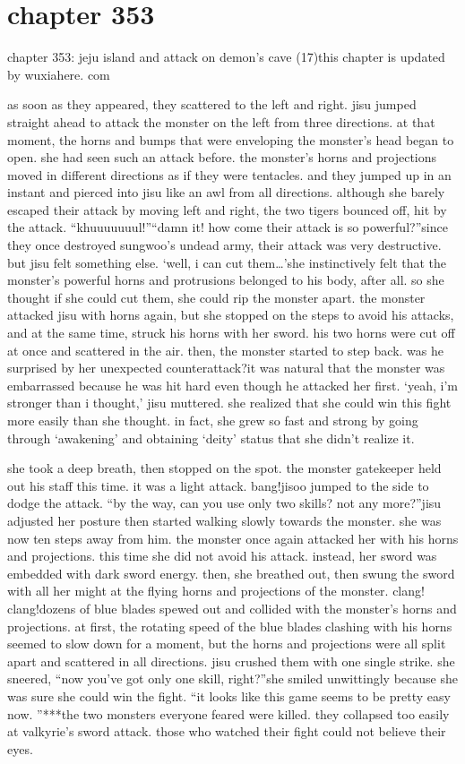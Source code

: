 \section{chapter 353}

chapter 353: jeju island and attack on demon’s cave (17)this chapter is updated by wuxiahere.
com




as soon as they appeared, they scattered to the left and right.
 jisu jumped straight ahead to attack the monster on the left from three directions.
at that moment, the horns and bumps that were enveloping the monster’s head began to open.
 she had seen such an attack before.
the monster’s horns and projections moved in different directions as if they were tentacles.
 and they jumped up in an instant and pierced into jisu like an awl from all directions.
although she barely escaped their attack by moving left and right, the two tigers bounced off, hit by the attack.
“khuuuuuuul!”“damn it! how come their attack is so powerful?”since they once destroyed sungwoo’s undead army, their attack was very destructive.
but jisu felt something else.
‘well, i can cut them…’she instinctively felt that the monster’s powerful horns and protrusions belonged to his body, after all.
 so she thought if she could cut them, she could rip the monster apart.
the monster attacked jisu with horns again, but she stopped on the steps to avoid his attacks, and at the same time, struck his horns with her sword.
his two horns were cut off at once and scattered in the air.
then, the monster started to step back.
 was he surprised by her unexpected counterattack?it was natural that the monster was embarrassed because he was hit hard even though he attacked her first.
‘yeah, i’m stronger than i thought,’ jisu muttered.
she realized that she could win this fight more easily than she thought.
 in fact, she grew so fast and strong by going through ‘awakening’ and obtaining ‘deity’ status that she didn’t realize it.

she took a deep breath, then stopped on the spot.
the monster gatekeeper held out his staff this time.
 it was a light attack.
bang!jisoo jumped to the side to dodge the attack.
“by the way, can you use only two skills? not any more?”jisu adjusted her posture then started walking slowly towards the monster.
 she was now ten steps away from him.
 the monster once again attacked her with his horns and projections.
this time she did not avoid his attack.
 instead, her sword was embedded with dark sword energy.
 then, she breathed out, then swung the sword with all her might at the flying horns and projections of the monster.
clang! clang!dozens of blue blades spewed out and collided with the monster’s horns and projections.
at first, the rotating speed of the blue blades clashing with his horns seemed to slow down for a moment, but the horns and projections were all split apart and scattered in all directions.
jisu crushed them with one single strike.
she sneered, “now you’ve got only one skill, right?”she smiled unwittingly because she was sure she could win the fight.
“it looks like this game seems to be pretty easy now.
”***the two monsters everyone feared were killed.
 they collapsed too easily at valkyrie’s sword attack.
 those who watched their fight could not believe their eyes.

